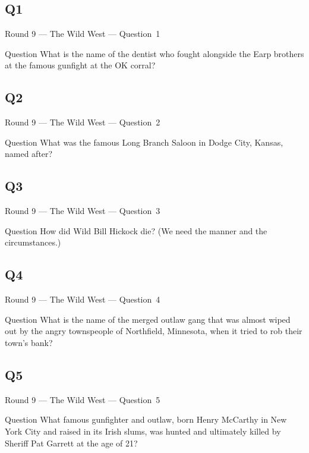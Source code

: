 \documentclass[11pt]{beamer}
\begin{document}
\subsection*{Q1}
\begin{frame}[t]{Round 9 --- The Wild West --- \mbox{Question 1}}
\vspace{-0.5em}
\begin{block}{Question}
What is the name of the dentist who fought alongside the Earp brothers at the famous gunfight at the OK corral?
\end{block}
\end{frame}
\subsection*{Q2}
\begin{frame}[t]{Round 9 --- The Wild West --- \mbox{Question 2}}
\vspace{-0.5em}
\begin{block}{Question}
What was the famous Long Branch Saloon in Dodge City, Kansas, named after?
\end{block}
\end{frame}
\subsection*{Q3}
\begin{frame}[t]{Round 9 --- The Wild West --- \mbox{Question 3}}
\vspace{-0.5em}
\begin{block}{Question}
How did Wild Bill Hickock die? (We need the manner and the circumstances.) 
\end{block}
\end{frame}
\subsection*{Q4}
\begin{frame}[t]{Round 9 --- The Wild West --- \mbox{Question 4}}
\vspace{-0.5em}
\begin{block}{Question}
What is the name of the merged outlaw gang that was almost  wiped out by the angry townspeople of Northfield, Minnesota, when it tried to rob their town's bank?
\end{block}
\end{frame}
\subsection*{Q5}
\begin{frame}[t]{Round 9 --- The Wild West --- \mbox{Question 5}}
\vspace{-0.5em}
\begin{block}{Question}
What famous gunfighter and outlaw, born Henry McCarthy in New York City and raised in its Irish slums, was hunted and ultimately killed by Sheriff Pat Garrett at the age of 21?
\end{block}
\end{frame}
\end{document}
